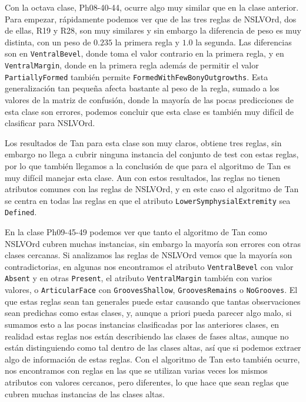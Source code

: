 Con la octava clase, Ph08-40-44, ocurre algo muy similar que en la clase anterior. Para empezar, rápidamente podemos ver que de las tres reglas de NSLVOrd, dos de ellas, R19 y R28, son muy similares y sin embargo la diferencia de peso es muy distinta, con un peso de $0.235$ la primera regla y $1.0$ la segunda. Las diferencias son en \texttt{VentralBevel}, donde toma el valor contrario en la primera regla, y en \texttt{VentralMargin}, donde en la primera regla además de permitir el valor \texttt{PartiallyFormed} también permite \texttt{FormedWithFewBonyOutgrowths}. Esta generalización tan pequeña afecta bastante al peso de la regla, sumado a los valores de la matriz de confusión, donde la mayoría de las pocas predicciones de esta clase son errores, podemos concluir que esta clase es también muy difícil de clasificar para NSLVOrd.

Los resultados de Tan para esta clase son muy claros, obtiene tres reglas, sin embargo no llega a cubrir ninguna instancia del conjunto de test con estas reglas, por lo que también llegamos a la conclusión de que para el algoritmo de Tan es muy difícil manejar esta clase. Aun con estos resultados, las reglas no tienen atributos comunes con las reglas de NSLVOrd, y en este caso el algoritmo de Tan se centra en todas las reglas en que el atributo \texttt{LowerSymphysialExtremity} sea \texttt{Defined}.


En la clase Ph09-45-49 podemos ver que tanto el algoritmo de Tan como NSLVOrd cubren muchas instancias, sin embargo la mayoría son errores con otras clases cercanas. Si analizamos las reglas de NSLVOrd vemos que la mayoría son contradictorias, en algunas nos encontramos el atributo \texttt{VentralBevel} con valor \texttt{Absent} y en otras \texttt{Present}, el atributo \texttt{VentralMargin} también con varios valores, o \texttt{ArticularFace} con \texttt{GroovesShallow}, \texttt{GroovesRemains} o \texttt{NoGrooves}. El que estas reglas sean tan generales puede estar causando que tantas observaciones sean predichas como estas clases, y, aunque a priori pueda parecer algo malo, si sumamos esto a las pocas instancias clasificadas por las anteriores clases, en realidad estas reglas nos están describiendo las clases de fases altas, aunque no están distinguiendo como tal dentro de las clases altas, así que si podemos extraer algo de información de estas reglas. Con el algoritmo de Tan esto también ocurre, nos encontramos con reglas en las que se utilizan varias veces los mismos atributos con valores cercanos, pero diferentes, lo que hace que sean reglas que cubren muchas instancias de las clases altas.


